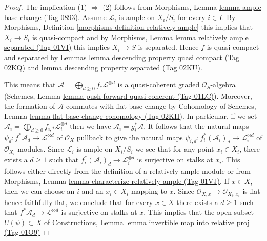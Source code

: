 \documentclass{amsart}
\theoremstyle{plain}
\theoremstyle{definition}
\theoremstyle{remark}
\numberwithin{equation}{subsection}
\begin{document}
\begin{proof}
The implication (1) $\Rightarrow$ (2) follows from
Morphisms, Lemma \href{https://stacks.math.columbia.edu/tag/0893}{lemma ample base change (Tag 0893)}.
Assume $\mathcal{L}_i$ is ample on $X_i/S_i$ for every $i \in I$.
By Morphisms, Definition \ref{morphisms-definition-relatively-ample}
this implies that $X_i \to S_i$ is quasi-compact and by
Morphisms, Lemma \href{https://stacks.math.columbia.edu/tag/01VI}{lemma relatively ample separated (Tag 01VI)}
this implies $X_i \to S$ is separated.
Hence $f$ is quasi-compact and separated by
Lemmas \href{https://stacks.math.columbia.edu/tag/02KQ}{lemma descending property quasi compact (Tag 02KQ)} and
\href{https://stacks.math.columbia.edu/tag/02KU}{lemma descending property separated (Tag 02KU)}.

\medskip\noindent
This means that
$\mathcal{A} = \bigoplus_{d \geq 0} f_*\mathcal{L}^{\otimes d}$
is a quasi-coherent graded $\mathcal{O}_S$-algebra
(Schemes, Lemma \href{https://stacks.math.columbia.edu/tag/01LC}{lemma push forward quasi coherent (Tag 01LC)}).
Moreover, the formation of $\mathcal{A}$ commutes with flat
base change by
Cohomology of Schemes, Lemma \href{https://stacks.math.columbia.edu/tag/02KH}{lemma flat base change cohomology (Tag 02KH)}.
In particular, if we set
$\mathcal{A}_i = \bigoplus_{d \geq 0} f_{i, *}\mathcal{L}_i^{\otimes d}$
then we have $\mathcal{A}_i = g_i^*\mathcal{A}$.
It follows that the natural maps
$\psi_d : f^*\mathcal{A}_d \to \mathcal{L}^{\otimes d}$
of $\mathcal{O}_X$
pullback to give the natural maps
$\psi_{i, d} : f_i^*(\mathcal{A}_i)_d \to \mathcal{L}_i^{\otimes d}$
of $\mathcal{O}_{X_i}$-modules. Since $\mathcal{L}_i$ is ample on $X_i/S_i$
we see that for any point $x_i \in X_i$, there exists a $d \geq 1$
such that $f_i^*(\mathcal{A}_i)_d \to \mathcal{L}_i^{\otimes d}$
is surjective on stalks at $x_i$. This follows either directly
from the definition of a relatively ample module or from
Morphisms, Lemma \href{https://stacks.math.columbia.edu/tag/01VJ}{lemma characterize relatively ample (Tag 01VJ)}.
If $x \in X$, then we can choose an $i$ and an $x_i \in X_i$
mapping to $x$. Since $\mathcal{O}_{X, x} \to \mathcal{O}_{X_i, x_i}$
is flat hence faithfully flat, we conclude that for every $x \in X$
there exists a $d \geq 1$ such that
$f^*\mathcal{A}_d \to \mathcal{L}^{\otimes d}$
is surjective on stalks at $x$.
This implies that the open subset $U(\psi) \subset X$ of
Constructions, Lemma
\href{https://stacks.math.columbia.edu/tag/01O9}{lemma invertible map into relative proj (Tag 01O9)}

\end{proof}
\end{document}
